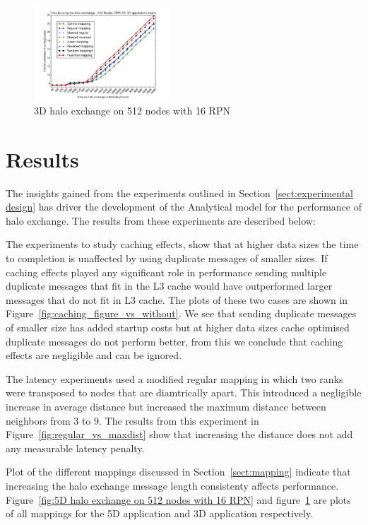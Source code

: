 \documentclass{acm_proc_article-sp}
\begin{document}
\begin{figure}
  \center
  \includegraphics[width=0.45\textwidth]{3D_512_all_mappings.png}
  \caption{3D halo exchange on 512 nodes with 16 RPN}
    \label{fig:3D halo exchange on 512 nodes with 16 RPN}
\end{figure}


\section{Results}

The insights gained from the experiments outlined in Section~\ref{sect:experimental design} has driver the development of
the Analytical model for the performance of halo exchange. The results from these experiments are described below:

The experiments to study caching effects, show that at higher data sizes the time to completion is unaffected by using duplicate messages of smaller sizes.
If caching effects played any significant role in performance sending multiple duplicate messages that fit in the L3 cache would have outperformed larger messages that do not fit in L3 cache. The plots of these two cases are shown in Figure~\ref{fig:caching_figure_vs_without}. We see that sending duplicate messages of smaller size has added startup costs but at
higher data sizes cache optimised  duplicate messages do not perform better, from this we conclude that caching effects are negligible and can be ignored.

The latency experiments used a modified regular mapping in which two ranks were transposed to nodes that are diamtrically apart.
This introduced a negligible increase in average distance but increased the maximum distance between neighbors from 3 to 9.
The results from this experiment in Figure~\ref{fig:regular_vs_maxdist} show that increasing the distance does not add any measurable latency penalty.

Plot of the different mappings discussed in Section~\ref{sect:mapping} indicate that increasing the halo exchange message length consistenty affects performance.
Figure~\ref{fig:5D halo exchange on 512 nodes with 16 RPN} and figure~\ref{fig:3D halo exchange on 512 nodes with 16 RPN} are plots of all mappings for the 5D application and 3D application respectively.
\end{document}

